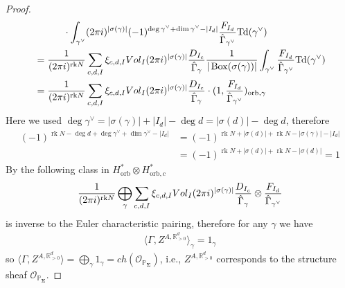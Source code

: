 \documentclass[11pt,reqno]{amsart}
\def\rk {{\operatorname{rk}}}
\def\R {{\mathbb R}}
\def\PP {{\mathbb P}}
\def\Vol {{\rm Vol}}
\theoremstyle{definition}
\numberwithin{equation}{section}
\begin{document}
\begin{proof}
\begin{align*}
		&\quad\quad\quad \cdot\int_{\gamma^{\vee}} (2\pi{\rm i})^{|\sigma(\gamma)|}(-1)^{\deg\gamma^{\vee}+\dim\gamma^{\vee}-|I_d|} \frac{F_{I_d}}{\hat{\Gamma}_{\gamma^{\vee}}}\mathrm{Td}(\gamma^{\vee})\\
		&=\frac{1}{(2\pi{\rm i})^{\rk N}}\sum_{c,d,I}\xi_{c,d,I}\Vol_I (2\pi{\rm i})^{|\sigma(\gamma)|} \frac{D_{I_c}}{\hat{\Gamma}_{\gamma}}\frac{1}{|\operatorname{Box}(\sigma(\gamma))|}\int_{\gamma^{\vee}} \frac{F_{I_d}}{\hat{\Gamma}_{\gamma^{\vee}}}\mathrm{Td}(\gamma^{\vee})\\
		&=\frac{1}{(2\pi{\rm i})^{\rk N}}\sum_{c,d,I}\xi_{c,d,I}\Vol_I (2\pi{\rm i})^{|\sigma(\gamma)|} \frac{D_{I_c}}{\hat{\Gamma}_{\gamma}}\cdot(1,\frac{F_{I_d}}{\hat{\Gamma}_{\gamma^{\vee}}})_{\mathrm{orb},\gamma}
	\end{align*}
	Here we used $\deg\gamma^{\vee}=|\sigma(\gamma)|+|I_d|-\deg d=|\sigma(d)|-\deg d$, therefore
	\begin{align*}
		(-1)^{\rk N-\deg d+\deg\gamma^{\vee}+\dim\gamma^{\vee}-|I_d|}&=(-1)^{\rk N+|\sigma(d)|+\rk N-|\sigma(\gamma)|-|I_d|}\\
		&=(-1)^{\rk N+|\sigma(d)|+\rk N-|\sigma(d)|}=1
	\end{align*}
	By \cite[Theorem 4.2]{BHanDuality} the following class in $H_{\mathrm{orb}}^*\otimes H_{\mathrm{orb},c}^*$
	\begin{align*}
		\frac{1}{(2\pi{\rm i})^{\rk N}}\bigoplus_{\gamma}\sum_{c,d,I}\xi_{c,d,I}\Vol_I (2\pi{\rm i})^{|\sigma(\gamma)|} \frac{D_{I_c}}{\hat{\Gamma}_{\gamma}}\otimes\frac{F_{I_d}}{\hat{\Gamma}_{\gamma^{\vee}}}
	\end{align*}
	is inverse to the Euler characteristic pairing, therefore for any $\gamma$ we have
	\begin{align*}
		\langle \Gamma,Z^{A,\R_{>0}^d} \rangle_{\gamma}=1_{\gamma}
	\end{align*}
	so $\langle \Gamma,Z^{A,\R_{>0}^d} \rangle=\bigoplus_{\gamma}1_{\gamma}=ch(\mathcal{O}_{\PP_{\mathbf{\Sigma}}})$, i.e., $Z^{A,\R_{>0}^d}$ corresponds to the structure sheaf $\mathcal{O}_{\PP_{\mathbf{\Sigma}}}$.
\end{proof}

\smallskip
\end{document}
